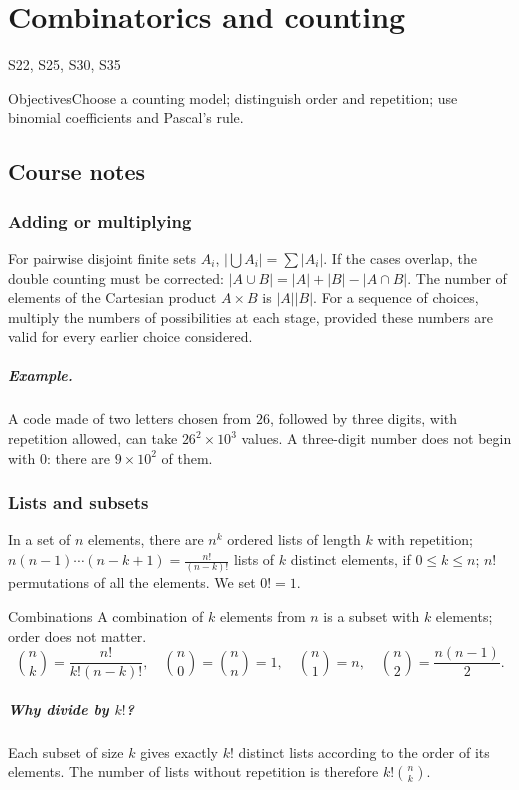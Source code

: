 \setcounter{chapter}{8}\chapter{Combinatorics and counting}\label{ch:9}

{\small\sffamily\color{teal}S22, S25, S30, S35\par}

\begin{retenir}{Objectives}Choose a counting model; distinguish order and repetition; use binomial coefficients and Pascal's rule.\end{retenir}

\section{Course notes}
\subsection{Adding or multiplying}
For pairwise disjoint finite sets $A_i$, $|\bigcup A_i|=\sum|A_i|$. If the cases overlap, the double counting must be corrected: $|A\cup B|=|A|+|B|-|A\cap B|$.
The number of elements of the Cartesian product $A\times B$ is $|A||B|$. For a sequence of choices, multiply the numbers of possibilities at each stage, provided these numbers are valid for every earlier choice considered.
\paragraph{Example.} A code made of two letters chosen from $26$, followed by three digits, with repetition allowed, can take $26^2\times10^3$ values. A three-digit number does not begin with $0$: there are $9\times10^2$ of them.
\subsection{Lists and subsets}
In a set of $n$ elements, there are $n^k$ ordered lists of length $k$ with repetition; $n(n-1)\cdots(n-k+1)=\frac{n!}{(n-k)!}$ lists of $k$ distinct elements, if $0\le k\le n$; $n!$ permutations of all the elements. We set $0!=1$.
\begin{retenir}{Combinations}
A combination of $k$ elements from $n$ is a subset with $k$ elements; order does not matter.
\[\binom nk=\frac{n!}{k!(n-k)!},\quad\binom n0=\binom nn=1,\quad\binom n1=n,\quad\binom n2=\frac{n(n-1)}2.\]
\end{retenir}
\paragraph{Why divide by $k!$?} Each subset of size $k$ gives exactly $k!$ distinct lists according to the order of its elements. The number of lists without repetition is therefore $k!\binom nk$.

